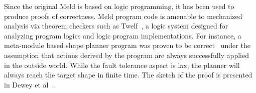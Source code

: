 Since the original Meld is based on logic programming, it has been used to produce proofs of correctness.
Meld program code is amenable to mechanized analysis via theorem checkers such as Twelf~\cite{twelf},
a logic system designed for analyzing program logics and logic program implementations.
For instance, a meta-module based shape planner program was proven to be correct~\cite{dewey-iros08,ashley-rollman-iclp09}
under the assumption that actions derived by the program are always successfully applied in the outside world.
While the fault tolerance aspect is lax, the planner will always reach the target shape in finite time.
The sketch of the proof is presented in Dewey et al~\cite{dewey-iros08}.